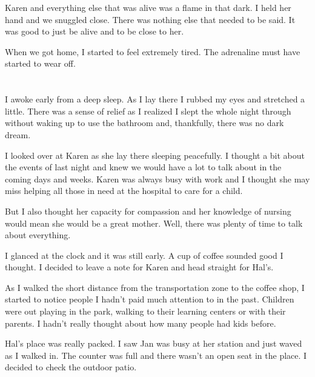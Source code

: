Karen and everything else that was alive was a flame in that
dark.  I held her hand and we snuggled close. There was nothing
else that needed to be said. It was good to just be alive and to be
close to her.

When we got home, I started to feel extremely tired. The
adrenaline must have started to wear off.
\section{}


I awoke early from a deep sleep. As I lay there I rubbed my eyes
and stretched a little. There was a sense of relief as I realized
I slept the whole night through without waking up to use the
bathroom and, thankfully, there was no dark dream.

I looked over at Karen as she lay there sleeping peacefully. I
thought a bit about the events of last night and knew we would have
a lot to talk about in the coming days and weeks. Karen was
always busy with work and I thought she may miss helping all
those in need at the hospital to care for a child.

But I also thought her capacity for compassion and her knowledge of
nursing would mean she would be a great mother. Well,
there was plenty of time to talk about everything.

I glanced at the clock and it was still early. A cup of coffee
sounded good I thought. I decided to leave a note for Karen and
head straight for Hal's.

As I walked the short distance from the transportation zone to
the coffee shop, I started to notice people I hadn't paid much
attention to in the past. Children were out playing in the park,
walking to their learning centers or with their parents. I
hadn't really thought about how many people had kids before.

Hal's place was really packed. I saw Jan was busy at her station
and just waved as I walked in. The counter was full and there
wasn't an open seat in the place. I decided to check the outdoor
patio.

